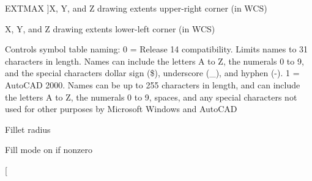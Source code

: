 \begin{Desc}
\begin{description}
{E\+X\+T\+M\+AX\hypertarget{class_c_a_d_header_abd894aab7aa85b4c4634e67fb93d6886aafa05d1c11168e2ebed258aff81d8d51}{}\label{class_c_a_d_header_abd894aab7aa85b4c4634e67fb93d6886aafa05d1c11168e2ebed258aff81d8d51}
}]X, Y, and Z drawing extents upper-\/right corner (in W\+CS) \item[{\em 
E\+X\+T\+M\+IN\hypertarget{class_c_a_d_header_abd894aab7aa85b4c4634e67fb93d6886afba4e43bf29f7dcf76c34e3134ced73c}{}\label{class_c_a_d_header_abd894aab7aa85b4c4634e67fb93d6886afba4e43bf29f7dcf76c34e3134ced73c}
}]X, Y, and Z drawing extents lower-\/left corner (in W\+CS) \item[{\em 
E\+X\+T\+N\+A\+M\+ES\hypertarget{class_c_a_d_header_abd894aab7aa85b4c4634e67fb93d6886a2b22d44ac28f419e1393790986ea292d}{}\label{class_c_a_d_header_abd894aab7aa85b4c4634e67fb93d6886a2b22d44ac28f419e1393790986ea292d}
}]Controls symbol table naming\+: 0 = Release 14 compatibility. Limits names to 31 characters in length. Names can include the letters A to Z, the numerals 0 to 9, and the special characters dollar sign (\$), underscore (\+\_\+), and hyphen (-\/). 1 = Auto\+C\+AD 2000. Names can be up to 255 characters in length, and can include the letters A to Z, the numerals 0 to 9, spaces, and any special characters not used for other purposes by Microsoft Windows and Auto\+C\+AD \item[{\em 
F\+I\+L\+L\+E\+T\+R\+AD\hypertarget{class_c_a_d_header_abd894aab7aa85b4c4634e67fb93d6886aed813e7f842a510975a70b9011fadd97}{}\label{class_c_a_d_header_abd894aab7aa85b4c4634e67fb93d6886aed813e7f842a510975a70b9011fadd97}
}]Fillet radius \item[{\em 
F\+I\+L\+L\+M\+O\+DE\hypertarget{class_c_a_d_header_abd894aab7aa85b4c4634e67fb93d6886ac8948c5714edbd842719aff4bc179139}{}\label{class_c_a_d_header_abd894aab7aa85b4c4634e67fb93d6886ac8948c5714edbd842719aff4bc179139}
}]Fill mode on if nonzero \item[{\em 
}
\end{description}
\end{Desc}
